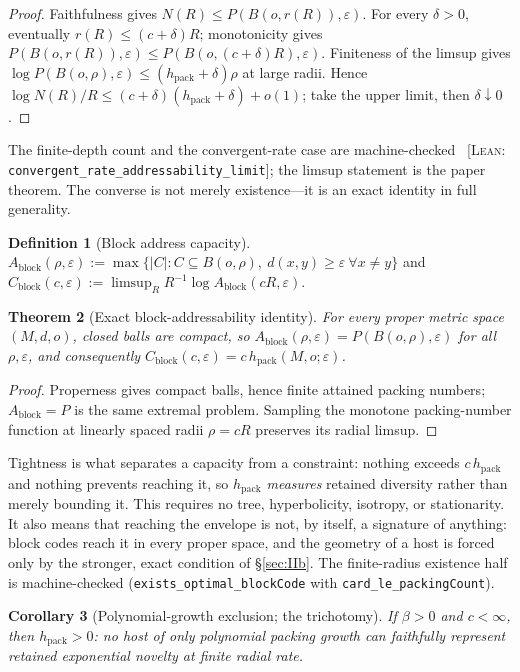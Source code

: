 \documentclass[11pt,reqno]{amsart}
\theoremstyle{plain}
\newtheorem{theorem}{Theorem}[section]
\newtheorem{corollary}[theorem]{Corollary}
\theoremstyle{definition}
\newtheorem{definition}[theorem]{Definition}
\newcommand{\hpack}{h_{\mathrm{pack}}}
\newcommand{\Cblock}{C_{\mathrm{block}}}
\newcommand{\eps}{\varepsilon}
\newcommand{\cert}[1]{{\footnotesize\ [\textsc{Lean}: \texttt{#1}]}}
\begin{document}
\begin{proof}
Faithfulness gives $N(R)\le P(B(o,r(R)),\eps)$. For every $\delta>0$, eventually $r(R)\le(c+\delta)R$; monotonicity gives $P(B(o,r(R)),\eps)\le P(B(o,(c+\delta)R),\eps)$. Finiteness of the limsup gives $\log P(B(o,\rho),\eps)\le(\hpack+\delta)\rho$ at large radii. Hence $\log N(R)/R\le(c+\delta)(\hpack+\delta)+o(1)$; take the upper limit, then $\delta\downarrow0$.
\end{proof}

The finite-depth count and the convergent-rate case are machine-checked \cert{convergent\_rate\_addressability\_limit}; the limsup statement is the paper theorem. The converse is not merely existence---it is an exact identity in full generality.

\begin{definition}[Block address capacity]
$A_{\mathrm{block}}(\rho,\eps):=\max\{|C|:C\subseteq B(o,\rho),\ d(x,y)\ge\eps\ \forall x\ne y\}$ and $\Cblock(c,\eps):=\limsup_R R^{-1}\log A_{\mathrm{block}}(cR,\eps)$.
\end{definition}

\begin{theorem}[Exact block-addressability identity]\label{thm:block}
For every proper metric space $(M,d,o)$, closed balls are compact, so $A_{\mathrm{block}}(\rho,\eps)=P(B(o,\rho),\eps)$ for all $\rho,\eps$, and consequently $\Cblock(c,\eps)=c\,\hpack(M,o;\eps)$.
\end{theorem}

\begin{proof}
Properness gives compact balls, hence finite attained packing numbers; $A_{\mathrm{block}}=P$ is the same extremal problem. Sampling the monotone packing-number function at linearly spaced radii $\rho=cR$ preserves its radial limsup.
\end{proof}

Tightness is what separates a capacity from a constraint: nothing exceeds $c\,\hpack$ and nothing prevents reaching it, so $\hpack$ \emph{measures} retained diversity rather than merely bounding it. This requires no tree, hyperbolicity, isotropy, or stationarity. It also means that reaching the envelope is not, by itself, a signature of anything: block codes reach it in every proper space, and the geometry of a host is forced only by the stronger, exact condition of \S\ref{sec:IIb}. The finite-radius existence half is machine-checked (\texttt{exists\_optimal\_blockCode} with \texttt{card\_le\_packingCount}).

\begin{corollary}[Polynomial-growth exclusion; the trichotomy]\label{cor:poly}
If $\beta>0$ and $c<\infty$, then $\hpack>0$: no host of only polynomial packing growth can faithfully represent retained exponential novelty at finite radial rate.
\end{corollary}
\end{document}

